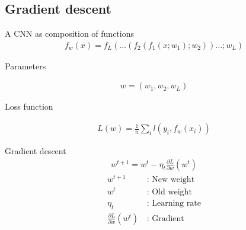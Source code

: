 \subsection{Gradient descent}
A CNN as composition of functions
\begin{align*}
    f_w(x)=f_L(\dots(f_2(f_1(x;w_1);w_2))\dots ; w_L)
\end{align*}

Parameters

\begin{align*}
    w=(w_1,w_2,w_L)
\end{align*}

Loss function

\begin{align*}
    L(w)=\frac{1}{n}\sum_i l(y_i, f_w(x_i))
\end{align*}

Gradient descent
\begin{align*}
    w^{t+1}=w^t-\eta_t\frac{\partial L}{\partial w}(w^t)
\end{align*}
\begin{align*}
    w^{t+1}&\,\text{: New weight}\\
    w^t&\,\text{: Old weight}\\
    \eta_t&\,\text{: Learning rate}\\
    \frac{\partial L}{\partial w}(w^t)&\,\text{: Gradient}
\end{align*}


